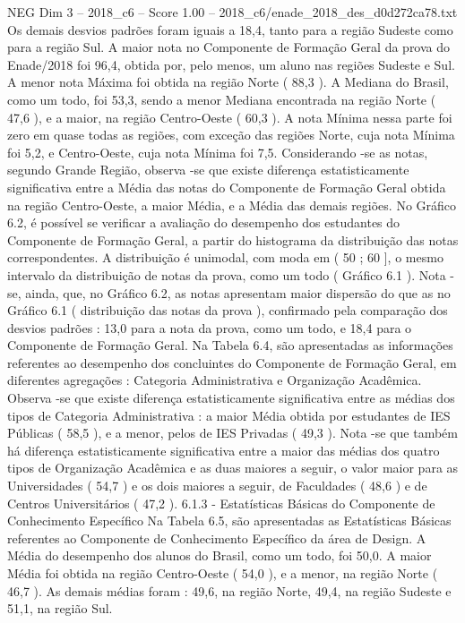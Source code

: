 \begin{textsample}{NEG Dim 3 – 2018\_c6 – Score 1.00 – 2018\_c6/enade\_2018\_des\_d0d272ca78.txt}
Os demais desvios padrões foram iguais a 18,4, tanto para a região Sudeste como para a região Sul.
A maior nota no Componente de Formação Geral da prova do Enade/2018 foi 96,4, obtida por, pelo menos, um aluno nas regiões Sudeste e Sul.
A menor nota Máxima foi obtida na região Norte ( 88,3 ).
A Mediana do Brasil, como um todo, foi 53,3, sendo a menor Mediana encontrada na região Norte ( 47,6 ), e a maior, na região Centro-Oeste ( 60,3 ).
A nota Mínima nessa parte foi zero em quase todas as regiões, com exceção das regiões Norte, cuja nota Mínima foi 5,2, e Centro-Oeste, cuja nota Mínima foi 7,5.
Considerando -se as notas, segundo Grande Região, observa -se que existe diferença estatisticamente significativa entre a Média das notas do Componente de Formação Geral obtida na região Centro-Oeste, a maior Média, e a Média das demais regiões.
No Gráfico 6.2, é possível se verificar a avaliação do desempenho dos estudantes do Componente de Formação Geral, a partir do histograma da distribuição das notas correspondentes.
A distribuição é unimodal, com moda em ( 50 ; 60 ], o mesmo intervalo da distribuição de notas da prova, como um todo ( Gráfico 6.1 ).
Nota -se, ainda, que, no Gráfico 6.2, as notas apresentam maior dispersão do que as no Gráfico 6.1 ( distribuição das notas da prova ), confirmado pela comparação dos desvios padrões : 13,0 para a nota da prova, como um todo, e 18,4 para o Componente de Formação Geral.
Na Tabela 6.4, são apresentadas as informações referentes ao desempenho dos concluintes do Componente de Formação Geral, em diferentes agregações : Categoria Administrativa e Organização Acadêmica.
Observa -se que existe diferença estatisticamente significativa entre as médias dos tipos de Categoria Administrativa : a maior Média obtida por estudantes de IES Públicas ( 58,5 ), e a menor, pelos de IES Privadas ( 49,3 ).
Nota -se que também há diferença estatisticamente significativa entre a maior das médias dos quatro tipos de Organização Acadêmica e as duas maiores a seguir, o valor maior para as Universidades ( 54,7 ) e os dois maiores a seguir, de Faculdades ( 48,6 ) e de Centros Universitários ( 47,2 ). 6.1.3 - Estatísticas Básicas do Componente de Conhecimento Específico Na Tabela 6.5, são apresentadas as Estatísticas Básicas referentes ao Componente de Conhecimento Específico da área de Design.
A Média do desempenho dos alunos do Brasil, como um todo, foi 50,0.
A maior Média foi obtida na região Centro-Oeste ( 54,0 ), e a menor, na região Norte ( 46,7 ).
As demais médias foram : 49,6, na região Norte, 49,4, na região Sudeste e 51,1, na região Sul.

\end{textsample}
